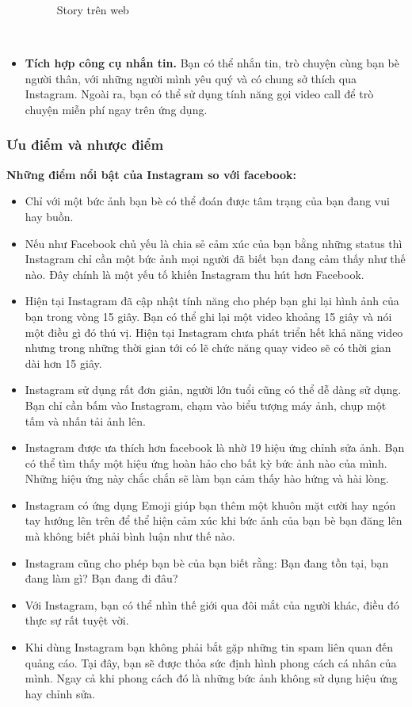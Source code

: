 \begin{itemize}
\begin{figure}[h!]
        \caption{Story trên web}
        \label{fig:my_label}
    \end{figure}
\\
\newpage
    \item \textbf{Tích hợp công cụ nhắn tin.} Bạn có thể nhắn tin, trò chuyện cùng bạn bè người thân, với những người mình yêu quý và có chung sở thích qua Instagram. Ngoài ra, bạn có thể sử dụng tính năng gọi video call để trò chuyện miễn phí ngay trên ứng dụng.
\end{itemize}

\subsubsection{Ưu điểm và nhược điểm}
\textbf{Những điểm nổi bật của Instagram so với facebook:}
\begin{itemize}
    \item Chỉ với một bức ảnh bạn bè có thể đoán được tâm trạng của bạn đang vui hay buồn.
    \item Nếu như Facebook chủ yếu là chia sẻ cảm xúc của bạn bằng những status thì Instagram chỉ cần một bức ảnh mọi người đã biết bạn đang cảm thấy như thế nào. Đây chính là một yếu tố khiến Instagram thu hút hơn Facebook.
    \item Hiện tại Instagram đã cập nhật tính năng cho phép bạn ghi lại hình ảnh của bạn trong vòng 15 giây. Bạn có thể ghi lại một video khoảng 15 giây và nói một điều gì đó thú vị. Hiện tại Instagram chưa phát triển hết khả năng video nhưng trong những thời gian tới có lẽ chức năng quay video sẽ có thời gian dài hơn 15 giây.
    \item Instagram sử dụng rất đơn giản, người lớn tuổi cũng có thể dễ dàng sử dụng. Bạn chỉ cần bấm vào Instagram, chạm vào biểu tượng máy ảnh, chụp một tấm và nhấn tải ảnh lên.
    \item Instagram được ưa thích hơn facebook là nhờ 19 hiệu ứng chỉnh sửa ảnh. Bạn có thể tìm thấy một hiệu ứng hoàn hảo cho bất kỳ bức ảnh nào của mình. Những hiệu ứng này chắc chắn sẽ làm bạn cảm thấy hào hứng và hài lòng.
    \item Instagram có ứng dụng Emoji giúp bạn thêm một khuôn mặt cười hay ngón tay hướng lên trên để thể hiện cảm xúc khi bức ảnh của bạn bè bạn đăng lên mà không biết phải bình luận như thế nào.
    \item Instagram cũng cho phép bạn bè của bạn biết rằng: Bạn đang tồn tại, bạn đang làm gì? Bạn đang đi đâu?
    \item Với Instagram, bạn có thể nhìn thế giới qua đôi mắt của người khác, điều đó thực sự rất tuyệt vời.
    \item Khi dùng Instagram bạn không phải bắt gặp những tin spam liên quan đến quảng cáo. Tại đây, bạn sẽ được thỏa sức định hình phong cách cá nhân của mình. Ngay cả khi phong cách đó là những bức ảnh không sử dụng hiệu ứng hay chỉnh sửa.
\end{itemize}
